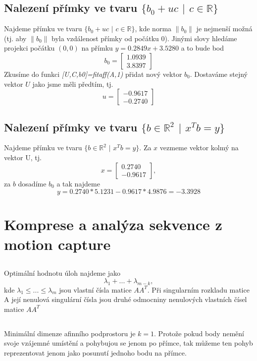 \documentclass[11pt]{article}
\begin{document}
\subsection{Nalezení přímky ve tvaru $\{b_{0}+uc$ $|$ $c \in \mathbb{R}\}$}
Najdeme přímku ve tvaru $\{b_{0}+uc$ $|$ $c \in \mathbb{R}\}$, kde norma $\|b_{0}\|$ je nejmenší možná (tj. aby $\|b_{0}\|$ byla vzdálenost přímky od počátku 0). Jinými slovy hledáme projekci počátku $(0,0)$ na přímku $y = 0.2849x + 3.5280$ a to bude bod $$ b_{0} = 
\begin{bmatrix}
1.0939\\
3.8397
\end{bmatrix}$$
Zkusíme do funkci \textit{[U,C,b0]=fitaff(A,1)} přidat nový vektor $b_{0}$. Dostaváme stejný vektor $U$ jako jsme měli předtím, tj. $$ u = 
\begin{bmatrix}
-0.9617\\
-0.2740
\end{bmatrix}$$

\subsection{Nalezení přímky ve tvaru $\{b \in \mathbb{R}^{2}$ $|$ $x^{T}b = y\}$}
Najdeme přímku ve tvaru $\{b \in \mathbb{R}^{2}$ $|$ $x^{T}b = y\}$. Za $x$ vezmeme vektor kolmý na vektor U, tj.
$$ x = 
\begin{bmatrix}
0.2740\\
-0.9617
\end{bmatrix},
$$ za $b$ dosadíme $b_{0}$ a tak najdeme 
$$y = 0.2740*5.1231-0.9617*4.9876 = -3.3928$$


\section{Komprese a analýza sekvence z motion capture}

\subsection{}
Optimální hodnotu úloh najdeme jako $$\lambda_{1}+...+\lambda_{m-k},$$ kde $\lambda_{1}\leqslant...\leqslant\lambda_{m}$ jsou vlastní čísla matice $AA^{T}.$
Při singularním rozkladu matice A její nenulová singulární čísla jsou druhé odmocniny nenulových vlastních čísel matice $AA^{T}$

\subsection{}
Minimální dimenze afinního podprostoru je $k=1$. Protože pokud body nemění svoje vzájemné umístění a pohybujou se jenom po přímce, tak můžeme ten pohyb reprezentovat jenom jako posunutí jednoho bodu na přímce.
\end{document}
